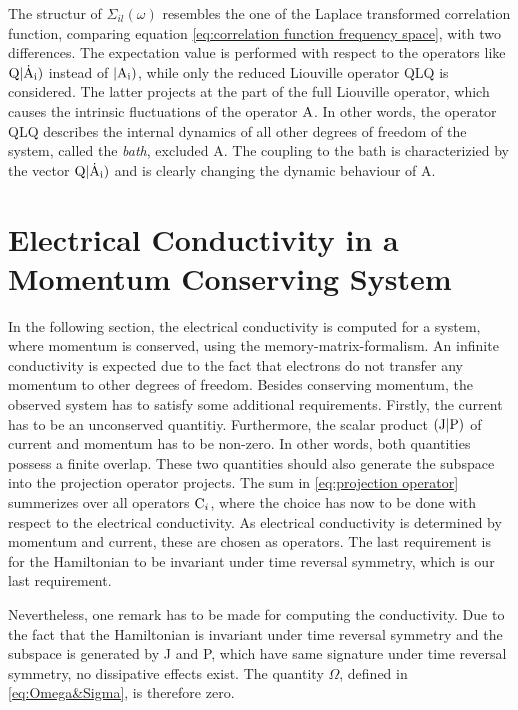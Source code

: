 The structur of $\Sigma_{il}(\omega)$ resembles the one of the Laplace transformed correlation function, comparing equation \eqref{eq:correlation function frequency space}, with two differences.
The expectation value is performed with respect to the operators like $\mathrm{Q}|\mathrm{\dot{\mathrm{A}}_{i}})$ instead of $|\mathrm{\mathrm{A}_{i}})$, while only the reduced Liouville operator QLQ is considered.
The latter projects at the part of the full Liouville operator, which causes the intrinsic fluctuations of the operator $\mathrm{A}$.
In other words, the operator QLQ describes the internal dynamics of all other degrees of freedom of the system, called the \emph{bath}, excluded A.
The coupling to the bath is characterizied by the vector $\mathrm{Q}|\mathrm{\dot{\mathrm{A}}_{i}})$ and is clearly changing the dynamic behaviour of A.
%
%
\section{Electrical Conductivity in a Momentum Conserving System}
\label{sec:conductivity conserved momentum}
%
%
In the following section, the electrical conductivity is computed for a system, where momentum is conserved, using the memory-matrix-formalism.
An infinite conductivity is expected due to the fact that electrons do not transfer any momentum to other degrees of freedom.
Besides conserving momentum, the observed system has to satisfy some additional requirements.
Firstly, the current has to be an unconserved quantitiy.
Furthermore, the scalar product $({\mathrm{J}}|{\mathrm{P}})$ of current and momentum has to be non-zero.
In other words, both quantities possess a finite overlap.
These two quantities should also generate the subspace into the projection operator projects.
The sum in \eqref{eq:projection operator} summerizes over all operators $\mathrm{C}_{i}$, where the choice has now to be done with respect to the electrical conductivity.
As electrical conductivity is determined by momentum and current, these are chosen as operators.
The last requirement is for the Hamiltonian to be invariant under time reversal symmetry, which is our last requirement.

Nevertheless, one remark has to be made for computing the conductivity.
Due to the fact that the Hamiltonian is invariant under time reversal symmetry and the subspace is generated by J and P, which have same signature under time reversal symmetry, no dissipative effects exist.
The quantity $\Omega$, defined in \eqref{eq:Omega&Sigma}, is therefore zero.

